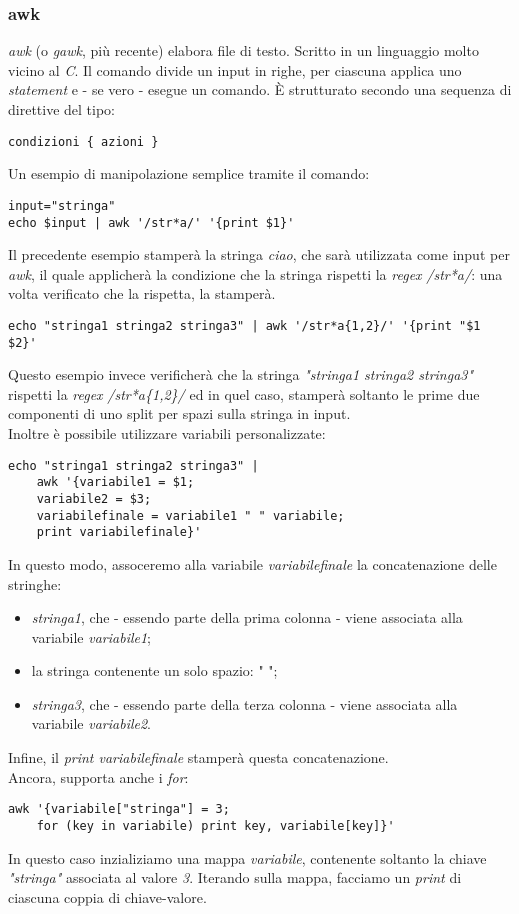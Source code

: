 \subsubsection{awk}
\textit{awk} (o \textit{gawk}, più recente) elabora file di testo. Scritto in un linguaggio molto vicino al \textit{C}. Il comando divide un input in righe, per ciascuna applica uno \textit{statement} e - se vero - esegue un comando. È strutturato secondo una sequenza di direttive del tipo:
\begin{lstlisting}
condizioni { azioni }
\end{lstlisting}
Un esempio di manipolazione semplice tramite il comando:
\begin{lstlisting}
input="stringa"
echo $input | awk '/str*a/' '{print $1}'
\end{lstlisting}
Il precedente esempio stamperà la stringa \textit{ciao}, che sarà utilizzata come input per \textit{awk}, il quale applicherà la condizione che la stringa rispetti la \textit{regex} \textit{/str*a/}: una volta verificato che la rispetta, la stamperà.
\begin{lstlisting}
echo "stringa1 stringa2 stringa3" | awk '/str*a{1,2}/' '{print "$1 $2}'
\end{lstlisting}
Questo esempio invece verificherà che la stringa \textit{"stringa1 stringa2 stringa3"} rispetti la \textit{regex} \textit{/str*a\{1,2\}/} ed in quel caso, stamperà soltanto le prime due componenti di uno split per spazi sulla stringa in input. \\
Inoltre è possibile utilizzare variabili personalizzate:
\begin{lstlisting}
echo "stringa1 stringa2 stringa3" |
    awk '{variabile1 = $1;
    variabile2 = $3;
    variabilefinale = variabile1 " " variabile;
    print variabilefinale}'
\end{lstlisting}
In questo modo, assoceremo alla variabile \textit{variabilefinale} la concatenazione delle stringhe:
\begin{itemize}
    \item \textit{stringa1}, che - essendo parte della prima colonna - viene associata alla variabile \textit{variabile1};
    \item la stringa contenente un solo spazio: " ";
    \item \textit{stringa3}, che - essendo parte della terza colonna - viene associata alla variabile \textit{variabile2}.
\end{itemize}
Infine, il \textit{print variabilefinale} stamperà questa concatenazione. \\
Ancora, supporta anche i \textit{for}:
\begin{lstlisting}
awk '{variabile["stringa"] = 3;
    for (key in variabile) print key, variabile[key]}'
\end{lstlisting}
In questo caso inzializiamo una mappa \textit{variabile}, contenente soltanto la chiave \textit{"stringa"} associata al valore \textit{3}. Iterando sulla mappa, facciamo un \textit{print} di ciascuna coppia di chiave-valore.

